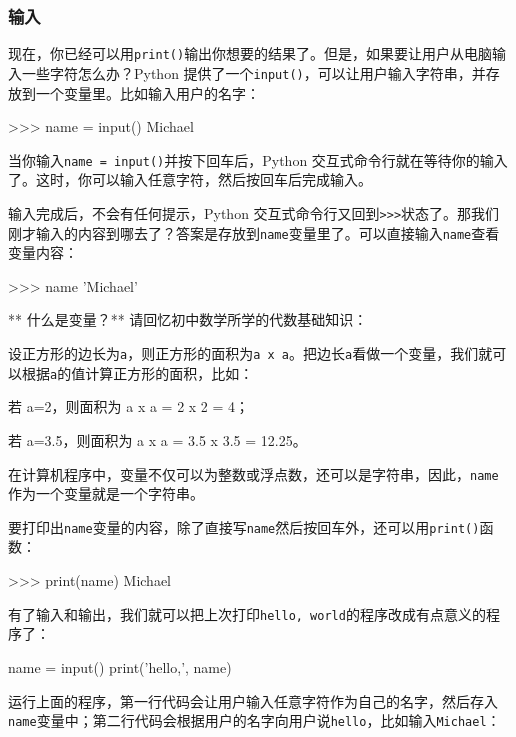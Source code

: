 \hypertarget{ux8f93ux5165}{%
\subsubsection{输入}\label{ux8f93ux5165}}

现在，你已经可以用\texttt{print()}输出你想要的结果了。但是，如果要让用户从电脑输入一些字符怎么办？Python
提供了一个\texttt{input()}，可以让用户输入字符串，并存放到一个变量里。比如输入用户的名字：

\begin{pythoncode}
>>> name = input()
Michael
\end{pythoncode}

当你输入\texttt{name\ =\ input()}并按下回车后，Python
交互式命令行就在等待你的输入了。这时，你可以输入任意字符，然后按回车后完成输入。

输入完成后，不会有任何提示，Python
交互式命令行又回到\texttt{\textgreater{}\textgreater{}\textgreater{}}状态了。那我们刚才输入的内容到哪去了？答案是存放到\texttt{name}变量里了。可以直接输入\texttt{name}查看变量内容：

\begin{pythoncode}
>>> name
'Michael'
\end{pythoncode}

** 什么是变量？** 请回忆初中数学所学的代数基础知识：

设正方形的边长为\texttt{a}，则正方形的面积为\texttt{a\ x\ a}。把边长\texttt{a}看做一个变量，我们就可以根据\texttt{a}的值计算正方形的面积，比如：

若 a=2，则面积为 a x a = 2 x 2 = 4；

若 a=3.5，则面积为 a x a = 3.5 x 3.5 = 12.25。

在计算机程序中，变量不仅可以为整数或浮点数，还可以是字符串，因此，\texttt{name}作为一个变量就是一个字符串。

要打印出\texttt{name}变量的内容，除了直接写\texttt{name}然后按回车外，还可以用\texttt{print()}函数：

\begin{pythoncode}
>>> print(name)
Michael
\end{pythoncode}

有了输入和输出，我们就可以把上次打印\texttt{\textquotesingle{}hello,\ world\textquotesingle{}}的程序改成有点意义的程序了：

\begin{pythoncode}
name = input()
print('hello,', name)
\end{pythoncode}

运行上面的程序，第一行代码会让用户输入任意字符作为自己的名字，然后存入\texttt{name}变量中；第二行代码会根据用户的名字向用户说\texttt{hello}，比如输入\texttt{Michael}：

